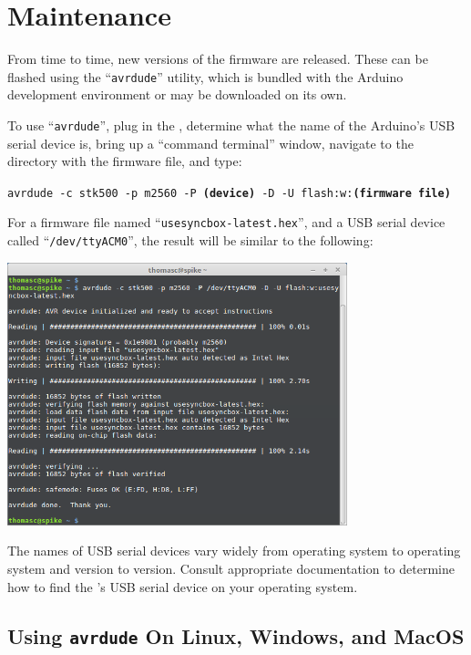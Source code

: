 %

\chapter{Maintenance}
\label{sect-maint}

From time to time, new versions of the {\projectname} firmware are released.
These can be flashed using the ``\texttt{avrdude}'' utility, which is
bundled with the Arduino development environment or may be downloaded
on its own.

To use ``\texttt{avrdude}'', plug in the {\projectname}, determine what the
name of the Arduino's USB serial device is, bring up a ``command terminal''
window, navigate to the directory with the firmware file, and type:

\texttt{avrdude -c stk500 -p m2560 -P {\bfseries (device)}
-D -U flash:w:{\bfseries (firmware file)}}

For a firmware file named ``\texttt{usesyncbox-latest.hex}'', and a
USB serial device called ``\texttt{/dev/ttyACM0}'', the result will be similar
to the following:

\begin{center}
\includegraphics[height=3in]{screenshots/avrdude-linux.png}
\end{center}

The names of USB serial devices vary widely from operating system to 
operating system and version to version. Consult appropriate documentation 
to determine how to find the {\projectname}'s USB serial device on your
operating system.

\section{Using \texttt{avrdude} On Linux, Windows, and MacOS}

